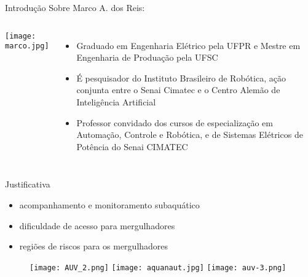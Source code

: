 \begin{frame}[t]{Introdução}
    Sobre Marco A. dos Reis:
    \transboxout[duration=0.5]
    \begin{columns}
            \texttt{[image: marco.jpg]}
            \begin{itemize}
                \item Graduado em Engenharia Elétrico pela UFPR e Mestre em Engenharia de Produação pela UFSC
                \item É pesquisador do Instituto Brasileiro de Robótica, ação conjunta entre o Senai Cimatec e o Centro Alemão de Inteligência Artificial
                \item Professor convidado dos cursos de especialização em Automação, Controle e Robótica, e de Sistemas Elétricos de Potência do Senai CIMATEC
            \end{itemize}
    \end{columns}
\end{frame}
\begin{frame}[c]{Justificativa}
    \begin{itemize}
        \item acompanhamento e monitoramento subaquático
        \item dificuldade de acesso para mergulhadores
        \item regiões de riscos para os mergulhadores
    \end{itemize}
    \begin{figure}
        \texttt{[image: AUV\_2.png]}
        \texttt{[image: aquanaut.jpg]}
        \texttt{[image: auv-3.png]}
    
    \end{figure}
    
\end{frame}
